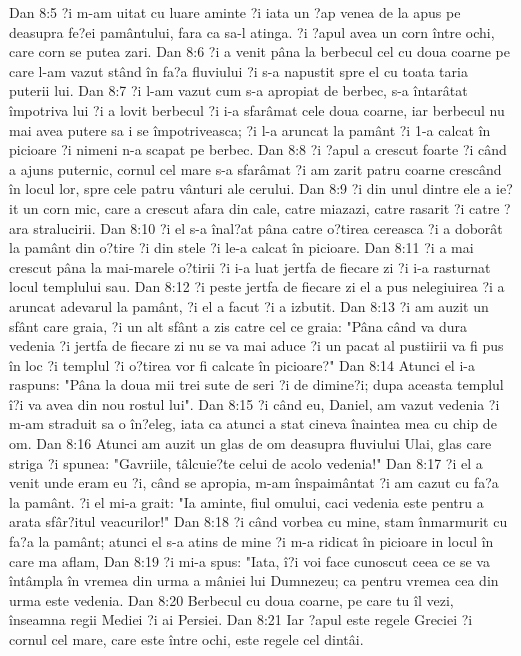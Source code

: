 Dan 8:5  ?i m-am uitat cu luare aminte ?i iata un ?ap venea de la apus pe deasupra fe?ei pamântului, fara ca sa-l atinga. ?i ?apul avea un corn între ochi, care corn se putea zari.
Dan 8:6  ?i a venit pâna la berbecul cel cu doua coarne pe care l-am vazut stând în fa?a fluviului ?i s-a napustit spre el cu toata taria puterii lui.
Dan 8:7  ?i l-am vazut cum s-a apropiat de berbec, s-a întarâtat împotriva lui ?i a lovit berbecul ?i i-a sfarâmat cele doua coarne, iar berbecul nu mai avea putere sa i se împotriveasca; ?i l-a aruncat la pamânt ?i 1-a calcat în picioare ?i nimeni n-a scapat pe berbec.
Dan 8:8  ?i ?apul a crescut foarte ?i când a ajuns puternic, cornul cel mare s-a sfarâmat ?i am zarit patru coarne crescând în locul lor, spre cele patru vânturi ale cerului.
Dan 8:9  ?i din unul dintre ele a ie?it un corn mic, care a crescut afara din cale, catre miazazi, catre rasarit ?i catre ?ara stralucirii.
Dan 8:10  ?i el s-a înal?at pâna catre o?tirea cereasca ?i a doborât la pamânt din o?tire ?i din stele ?i le-a calcat în picioare.
Dan 8:11  ?i a mai crescut pâna la mai-marele o?tirii ?i i-a luat jertfa de fiecare zi ?i i-a rasturnat locul templului sau.
Dan 8:12  ?i peste jertfa de fiecare zi el a pus nelegiuirea ?i a aruncat adevarul la pamânt, ?i el a facut ?i a izbutit.
Dan 8:13  ?i am auzit un sfânt care graia, ?i un alt sfânt a zis catre cel ce graia: "Pâna când va dura vedenia ?i jertfa de fiecare zi nu se va mai aduce ?i un pacat al pustiirii va fi pus în loc ?i templul ?i o?tirea vor fi calcate în picioare?"
Dan 8:14  Atunci el i-a raspuns: "Pâna la doua mii trei sute de seri ?i de dimine?i; dupa aceasta templul î?i va avea din nou rostul lui".
Dan 8:15  ?i când eu, Daniel, am vazut vedenia ?i m-am straduit sa o în?eleg, iata ca atunci a stat cineva înaintea mea cu chip de om.
Dan 8:16  Atunci am auzit un glas de om deasupra fluviului Ulai, glas care striga ?i spunea: "Gavriile, tâlcuie?te celui de acolo vedenia!"
Dan 8:17  ?i el a venit unde eram eu ?i, când se apropia, m-am înspaimântat ?i am cazut cu fa?a la pamânt. ?i el mi-a grait: "Ia aminte, fiul omului, caci vedenia este pentru a arata sfâr?itul veacurilor!"
Dan 8:18  ?i când vorbea cu mine, stam înmarmurit cu fa?a la pamânt; atunci el s-a atins de mine ?i m-a ridicat în picioare in locul în care ma aflam,
Dan 8:19  ?i mi-a spus: "Iata, î?i voi face cunoscut ceea ce se va întâmpla în vremea din urma a mâniei lui Dumnezeu; ca pentru vremea cea din urma este vedenia.
Dan 8:20  Berbecul cu doua coarne, pe care tu îl vezi, înseamna regii Mediei ?i ai Persiei.
Dan 8:21  Iar ?apul este regele Greciei ?i cornul cel mare, care este între ochi, este regele cel dintâi.
